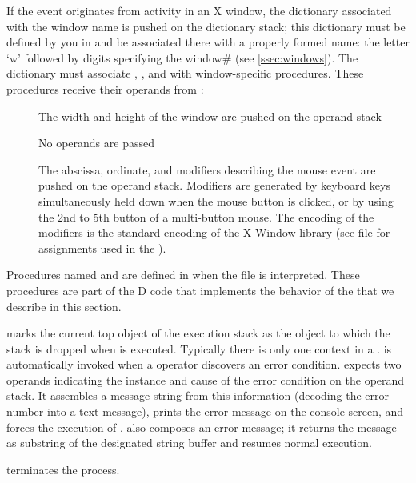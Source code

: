 \noindent If the event originates from activity in an X window, the
dictionary associated with the window name is pushed on the dictionary
stack; this dictionary must be defined by you in  and be
associated there with a properly formed name: the letter `w' followed
by digits specifying the window\# (see \ref{ssec:windows}). The
dictionary must associate , , and
 with window-specific procedures. These procedures
receive their operands from :

\begin{description}
\item[] The width and height of the window are pushed
  on the operand stack
\item[] No operands are passed
\item[] The abscissa, ordinate, and modifiers
  describing the mouse event are pushed on the operand
  stack. Modifiers are generated by keyboard keys simultaneously held
  down when the mouse button is clicked, or by using the 2nd to 5th
  button of a multi-button mouse. The encoding of the modifiers is the
  standard encoding of the X Window library (see file
   for assignments used in the ).
\end{description}

Procedures named  and  are defined
in  when the file  is
interpreted. These procedures are part of the D code that implements
the behavior of the  that we describe in this section.

 marks the current top object of the execution stack as
the object to which the stack is dropped when  is
executed. Typically there is only one  context in a
.  is automatically invoked when a 
operator discovers an error condition.  expects two operands
indicating the instance and cause of the error condition on the
operand stack. It assembles a message string from this information
(decoding the error number into a text message), prints the error
message on the console screen, and forces the execution of
.  also composes an error message; it
returns the message as substring of the designated string buffer and
resumes normal execution.

 terminates the  process.

